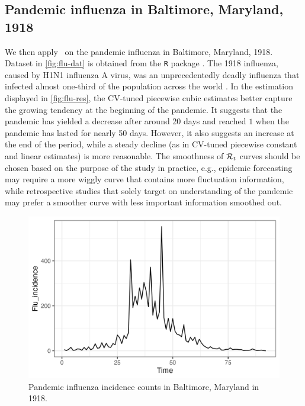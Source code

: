 \subsection{Pandemic influenza in Baltimore, Maryland, 1918}

We then apply \RtEstim\ on the pandemic influenza in Baltimore, Maryland, 1918. Dataset in \autoref{fig:flu-dat} is obtained from the \texttt{R} package \EpiEstim. The 1918 influenza, caused by H1N1 influenza A virus, was an unprecedentedly deadly influenza that infected almost one-third of the population across the world \citep{taubenberger20061918}. 
In the estimation displayed in \autoref{fig:flu-res}, the CV-tuned piecewise cubic estimates better capture the growing tendency at the beginning of the pandemic. It suggests that the pandemic has yielded a decrease after around 20 days and reached $1$ when the pandemic has lasted for nearly 50 days. However, it also suggests an increase at the end of the period, while a steady decline (as in CV-tuned piecewise constant and linear estimates) is more reasonable. The smoothness of $\mathcal{R}_t$ curves should be chosen based on the purpose of the study in practice, e.g., epidemic forecasting may require a more wiggly curve that contains more fluctuation information, while retrospective studies that solely target on understanding of the pandemic may prefer a smoother curve with less important information smoothed out. 
\begin{figure}[tb]
    \centering
    \includegraphics[width=0.9\linewidth]{fig/flu_dat.png}
    \caption{Pandemic influenza incidence counts in Baltimore, Maryland in 1918.} 
    \label{fig:flu-dat}
\end{figure} 

